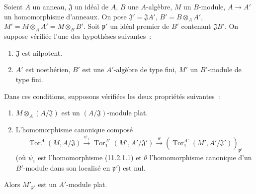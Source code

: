\begin{lemma}[11.2.5]
\label{IV.11.2.5-fr}
Soient $A$ un anneau, $\mathfrak J$ un idéal de $A$, $B$ une $A$-algèbre,
$M$ un $B$-module, $A\to A'$ un homomorphisme d'anneaux. On pose
$\mathfrak J'=\mathfrak JA'$, $B'=B\otimes_AA'$,
$M'=M\otimes_AA'=M\otimes_BB'$. Soit $\mathfrak p'$ un idéal premier de
$B'$ contenant $\mathfrak JB'$. On suppose vérifiée l'une des hypothèses
suivantes~:
\begin{enumerate}[label=\textit{\alph*)}]
\item $\mathfrak J$ est nilpotent.
\item $A'$ est noethérien, $B'$ est une $A'$-algèbre de type fini, $M'$ un
$B'$-module de type fini.
\end{enumerate}
Dans ces conditions, supposons vérifiées les deux propriétés suivantes~:
\begin{enumerate}[label=\emph{(\roman*)}]
\item $M\otimes_A(A/\mathfrak J)$ est un $(A/\mathfrak J)$-module plat.
\item L'homomorphisme canonique composé
\[
\operatorname{Tor}_1^A(M,A/\mathfrak J)\xrightarrow{\psi_1}
\operatorname{Tor}_1^{A'}(M',A'/\mathfrak J')\xrightarrow{\theta}
(\operatorname{Tor}_1^{A'}(M',A'/\mathfrak J'))_{\mathfrak p'}
\]
(où $\psi_1$ est l'homomorphisme (11.2.1.1) et $\theta$ l'homomorphisme
canonique d'un $B'$-module dans son localisé en $\mathfrak p'$) est nul.
\end{enumerate}
Alors $M'_{\mathfrak p'}$ est un $A'$-module plat.
\end{lemma}

